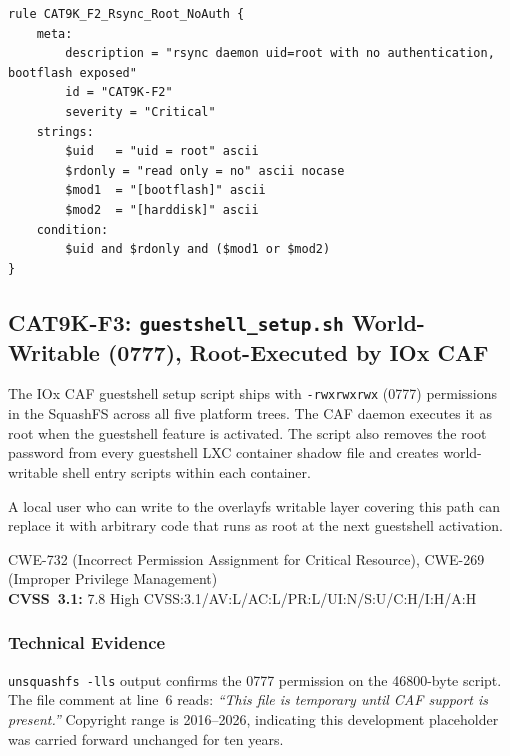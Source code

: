 \documentclass[11pt,a4paper]{article}
\begin{document}
\begin{lstlisting}[style=yara]
rule CAT9K_F2_Rsync_Root_NoAuth {
    meta:
        description = "rsync daemon uid=root with no authentication, bootflash exposed"
        id = "CAT9K-F2"
        severity = "Critical"
    strings:
        $uid   = "uid = root" ascii
        $rdonly = "read only = no" ascii nocase
        $mod1  = "[bootflash]" ascii
        $mod2  = "[harddisk]" ascii
    condition:
        $uid and $rdonly and ($mod1 or $mod2)
}
\end{lstlisting}

\subsection{CAT9K-F3: \texorpdfstring{\texttt{guestshell\_setup.sh}}{guestshell\_setup.sh} World-Writable (0777), Root-Executed by IOx CAF}

\begin{overviewbox}
The IOx CAF guestshell setup script ships with \texttt{-rwxrwxrwx} (0777) permissions
in the SquashFS across all five platform trees. The CAF daemon executes it as root when
the guestshell feature is activated. The script also removes the root password from
every guestshell LXC container shadow file and creates world-writable shell entry
scripts within each container.

A local user who can write to the overlayfs writable layer covering this path can
replace it with arbitrary code that runs as root at the next guestshell activation.

CWE-732 (Incorrect Permission Assignment for Critical Resource), CWE-269 (Improper Privilege Management)\\
\textbf{CVSS~3.1:} 7.8 High \quad CVSS:3.1/AV:L/AC:L/PR:L/UI:N/S:U/C:H/I:H/A:H
\end{overviewbox}

\subsubsection{Technical Evidence}

\texttt{unsquashfs -lls} output confirms the 0777 permission on the 46800-byte script.
The file comment at line~6 reads: \textit{``This file is temporary until CAF support is
present.''} Copyright range is 2016--2026, indicating this development placeholder was
carried forward unchanged for ten years.
\end{document}
